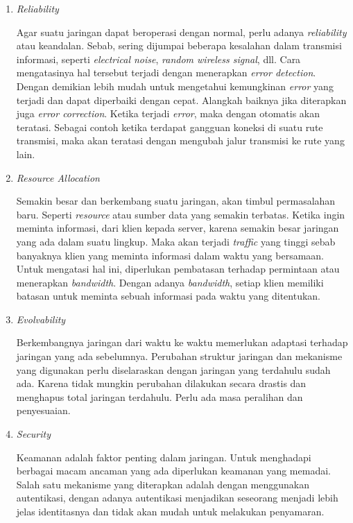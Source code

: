 \begin{enumerate}
  \item{\emph{Reliability}}

  Agar suatu jaringan dapat beroperasi dengan normal, perlu adanya \emph{reliability} atau keandalan. Sebab, sering dijumpai beberapa kesalahan dalam transmisi informasi, seperti \emph{electrical noise}, \emph{random wireless signal}, dll. Cara mengatasinya hal tersebut terjadi dengan menerapkan \emph{error detection}. Dengan demikian lebih mudah untuk mengetahui kemungkinan \emph{error} yang terjadi dan dapat diperbaiki dengan cepat. Alangkah baiknya jika diterapkan juga \emph{error correction}. Ketika terjadi \emph{error}, maka dengan otomatis akan teratasi. Sebagai contoh ketika terdapat gangguan koneksi di suatu rute transmisi, maka akan teratasi dengan mengubah jalur transmisi ke rute yang lain.

  \item{\emph{Resource Allocation}}

  Semakin besar dan berkembang suatu jaringan, akan timbul permasalahan baru. Seperti \emph{resource} atau sumber data yang semakin terbatas. Ketika ingin meminta informasi, dari klien kepada server, karena semakin besar jaringan yang ada dalam suatu lingkup. Maka akan terjadi \emph{traffic} yang tinggi sebab banyaknya klien yang meminta informasi dalam waktu yang bersamaan. Untuk mengatasi hal ini, diperlukan pembatasan terhadap permintaan atau menerapkan \emph{bandwidth}. Dengan adanya \emph{bandwidth}, setiap klien memiliki batasan untuk meminta sebuah informasi pada waktu yang ditentukan.

  \item{\emph{Evolvability}}

  Berkembangnya jaringan dari waktu ke waktu memerlukan adaptasi terhadap jaringan yang ada sebelumnya. Perubahan struktur jaringan dan mekanisme yang digunakan perlu diselaraskan dengan jaringan yang terdahulu sudah ada. Karena tidak mungkin perubahan dilakukan secara drastis dan menghapus total jaringan terdahulu. Perlu ada masa peralihan dan penyesuaian.

  \item{\emph{Security}}
  
  Keamanan adalah faktor penting dalam jaringan. Untuk menghadapi berbagai macam ancaman yang ada diperlukan keamanan yang memadai. Salah satu mekanisme yang diterapkan adalah dengan menggunakan autentikasi, dengan adanya autentikasi menjadikan seseorang menjadi lebih jelas identitasnya dan tidak akan mudah untuk melakukan penyamaran.
\end{enumerate}

